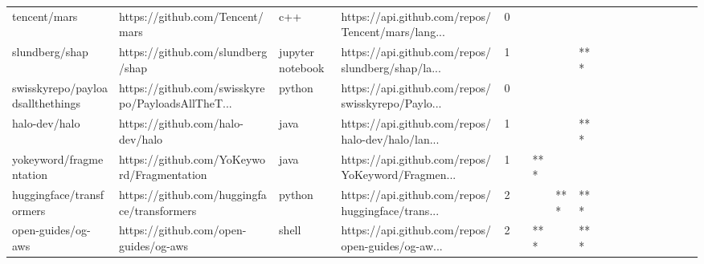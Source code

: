 \begin{tabular}{llllrlllllllllllll}
tencent/mars                                       &                    https://github.com/Tencent/mars &               c++ &  https://api.github.com/repos/Tencent/mars/lang... &       0 &         &        &           &                &                 &        &           &           &          &          &       &              &          \\
slundberg/shap                                     &                  https://github.com/slundberg/shap &  jupyter notebook &  https://api.github.com/repos/slundberg/shap/la... &       1 &         &        &           &            *** &                 &        &           &           &          &          &       &              &          \\
swisskyrepo/payloadsallthethings                   &  https://github.com/swisskyrepo/PayloadsAllTheT... &            python &  https://api.github.com/repos/swisskyrepo/Paylo... &       0 &         &        &           &                &                 &        &           &           &          &          &       &              &          \\
halo-dev/halo                                      &                   https://github.com/halo-dev/halo &              java &  https://api.github.com/repos/halo-dev/halo/lan... &       1 &         &        &           &            *** &                 &        &           &           &          &          &       &              &          \\
yokeyword/fragmentation                            &         https://github.com/YoKeyword/Fragmentation &              java &  https://api.github.com/repos/YoKeyword/Fragmen... &       1 &         &    *** &           &                &                 &        &           &           &          &          &       &              &          \\
huggingface/transformers                           &        https://github.com/huggingface/transformers &            python &  https://api.github.com/repos/huggingface/trans... &       2 &         &        &       *** &            *** &                 &        &           &           &          &          &       &              &          \\
open-guides/og-aws                                 &              https://github.com/open-guides/og-aws &             shell &  https://api.github.com/repos/open-guides/og-aw... &       2 &         &    *** &           &            *** &                 &        &           &           &          &          &       &              &          \\

\end{tabular}
